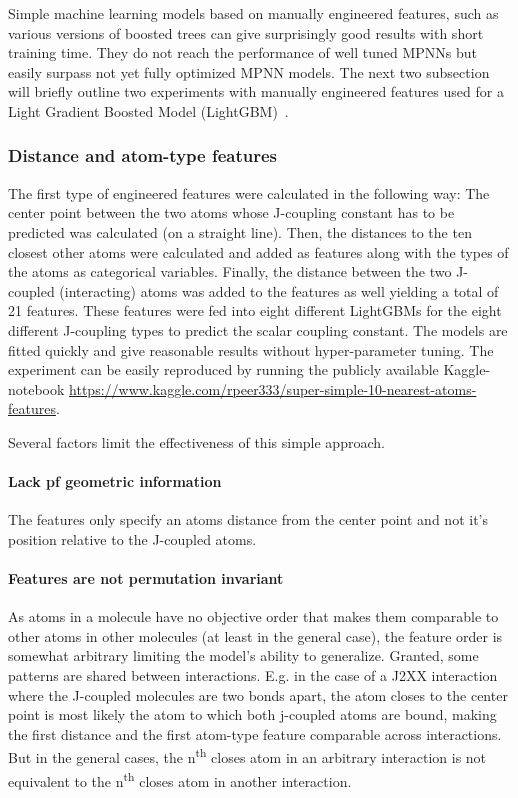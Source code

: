 Simple machine learning models based on manually engineered features, such as various versions of boosted trees can give surprisingly good results with short training time. They do not reach the performance of well tuned MPNNs but easily surpass not yet fully optimized MPNN models. The next two subsection will briefly outline two experiments with manually engineered features used for a Light Gradient Boosted Model (LightGBM)~\cite{Ke2017}.

\subsubsection{Distance and atom-type features}

The first type of engineered features were calculated in the following way: The center point between the two atoms whose J-coupling constant has to be predicted was calculated (on a straight line). Then, the distances to the ten closest other atoms were calculated and added as features along with the types of the atoms as categorical variables. Finally, the distance between the two J-coupled (interacting) atoms was added to the features as well yielding a total of 21 features. These features were fed into eight different LightGBMs
for the eight different J-coupling types to predict the scalar coupling constant. The models are fitted quickly and give reasonable results without hyper-parameter tuning. The experiment can be easily reproduced by running the publicly available Kaggle-notebook \url{https://www.kaggle.com/rpeer333/super-simple-10-nearest-atoms-features}.

Several factors limit the effectiveness of this simple approach.

\paragraph{Lack pf geometric information} The features only specify an atoms distance from the center point and not it's position relative to the J-coupled atoms.

\paragraph{Features are not permutation invariant} As atoms in a molecule have no objective order that makes them comparable to other atoms in other molecules (at least in the general case), the feature order is somewhat arbitrary limiting the model's ability to generalize. Granted, some patterns are shared between interactions. E.g. in the case of a J2XX interaction where the J-coupled molecules are two bonds apart, the atom closes to the center point is most likely the atom to which both j-coupled atoms are bound, making the first distance and the first atom-type feature comparable across interactions. But in the general cases, the n\textsuperscript{th} closes atom in an arbitrary interaction is not equivalent to the n\textsuperscript{th} closes atom in another interaction.

